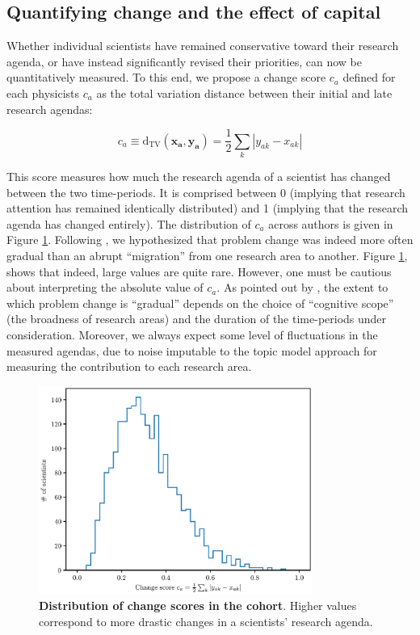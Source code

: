 \documentclass{article}
\begin{document}
\subsection{\label{sec:magnitude}Quantifying change and the effect of capital}

Whether individual scientists have remained  conservative toward their research agenda, or have instead significantly revised their priorities, can now be quantitatively measured. To this end, we propose a change score $c_a$ defined for each physicists $c_a$ as the total variation distance between their initial and late research agendas:

\begin{equation}
    c_a \equiv \mathrm{d}_{\text{TV}}(\bm{x_a},\bm{y_a}) = \frac{1}{2} \sum_k |y_{ak}-x_{ak}|
\end{equation}

This score measures how much the research agenda of a scientist has changed between the two time-periods. It is comprised between 0 (implying that research attention has remained identically distributed) and 1 (implying that the research agenda has changed entirely). The distribution of $c_a$ across authors is given in Figure \ref{fig:change_scores}. Following \citet{Gieryn1978}, we hypothesized that problem change was indeed more often gradual than an abrupt ``migration'' from one research area to another. Figure \ref{fig:change_scores}, shows that indeed, large values are quite rare. However, one must be cautious about interpreting the absolute value of $c_a$. As pointed out by \citet{Gieryn1978}, the extent to which problem change is ``gradual'' depends on the choice of ``cognitive scope'' (the broadness of research areas) and the duration of the time-periods under consideration.  Moreover, we always expect some level of fluctuations in the measured agendas, due to noise imputable to the topic model approach for measuring the contribution to each research area.

\begin{figure}
    \centering
        \includegraphics[width=0.8\textwidth]{plots/change_score.eps}
    \caption{\textbf{Distribution of change scores in the cohort}. Higher values correspond to more drastic changes in a scientists' research agenda.}    
    \label{fig:change_scores}
\end{figure}
\end{document}
